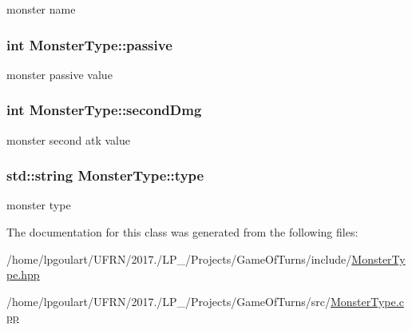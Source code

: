 monster name 

\subsubsection[{\texorpdfstring{passive}{passive}}]{\setlength{\rightskip}{0pt plus 5cm}int Monster\+Type\+::passive\hspace{0.3cm}{\ttfamily [private]}}\hypertarget{classMonsterType_a724fe4488d7b1f3e98acc95cd918d48b}{}\label{classMonsterType_a724fe4488d7b1f3e98acc95cd918d48b}


monster passive value 

\subsubsection[{\texorpdfstring{second\+Dmg}{secondDmg}}]{\setlength{\rightskip}{0pt plus 5cm}int Monster\+Type\+::second\+Dmg\hspace{0.3cm}{\ttfamily [private]}}\hypertarget{classMonsterType_a55aa99c36bbd1d9b9c19bffee306e19b}{}\label{classMonsterType_a55aa99c36bbd1d9b9c19bffee306e19b}


monster second atk value 

\subsubsection[{\texorpdfstring{type}{type}}]{\setlength{\rightskip}{0pt plus 5cm}std\+::string Monster\+Type\+::type\hspace{0.3cm}{\ttfamily [private]}}\hypertarget{classMonsterType_a8f50399e55fb9de06c7a316bf3564cc3}{}\label{classMonsterType_a8f50399e55fb9de06c7a316bf3564cc3}


monster type 



The documentation for this class was generated from the following files\+:\begin{DoxyCompactItemize}
\item 
/home/lpgoulart/\+U\+F\+R\+N/2017./\+L\+P\+\_/\+Projects/\+Game\+Of\+Turns/include/\hyperlink{MonsterType_8hpp}{Monster\+Type.\+hpp}\item 
/home/lpgoulart/\+U\+F\+R\+N/2017./\+L\+P\+\_/\+Projects/\+Game\+Of\+Turns/src/\hyperlink{MonsterType_8cpp}{Monster\+Type.\+cpp}\end{DoxyCompactItemize}
